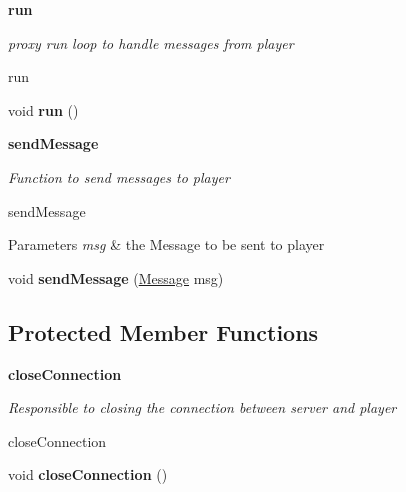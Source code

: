 \begin{Indent}{\bf run}\par
{\em proxy run loop to handle messages from player

run }\begin{DoxyCompactItemize}
\item 
\hypertarget{classbattleship_1_1network_1_1PlayerProxy_a17c63f500958865bdf23b030e6739ab6}{}void {\bfseries run} ()\label{classbattleship_1_1network_1_1PlayerProxy_a17c63f500958865bdf23b030e6739ab6}

\end{DoxyCompactItemize}
\end{Indent}
\begin{Indent}{\bf send\+Message}\par
{\em Function to send messages to player

send\+Message


\begin{DoxyParams}{Parameters}
{\em msg} & the Message to be sent to player \\
\hline
\end{DoxyParams}
}\begin{DoxyCompactItemize}
\item 
\hypertarget{classbattleship_1_1network_1_1PlayerProxy_a5a8de06e6bd545b779f9a6e4a3cdc834}{}void {\bfseries send\+Message} (\hyperlink{classbattleship_1_1game_1_1Message}{Message} msg)\label{classbattleship_1_1network_1_1PlayerProxy_a5a8de06e6bd545b779f9a6e4a3cdc834}

\end{DoxyCompactItemize}
\end{Indent}
\subsection*{Protected Member Functions}
\begin{Indent}{\bf close\+Connection}\par
{\em Responsible to closing the connection between server and player

close\+Connection }\begin{DoxyCompactItemize}
\item 
\hypertarget{classbattleship_1_1network_1_1PlayerProxy_a0420927cda66f753c86974d71bc42dd6}{}void {\bfseries close\+Connection} ()\label{classbattleship_1_1network_1_1PlayerProxy_a0420927cda66f753c86974d71bc42dd6}

\end{DoxyCompactItemize}
\end{Indent}
